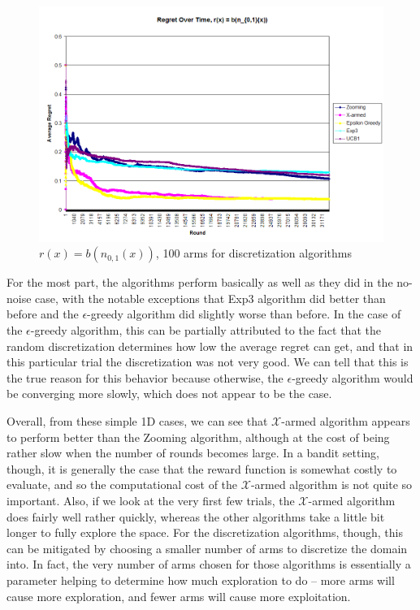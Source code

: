 \begin{figure}[!ht]
  \begin{center}
    \includegraphics[width=\figwidth]{figures/1dnoiseplot.png}
     \caption{$r(x) = b(n_{0,1}(x))$, 100 arms for discretization
     algorithms}
     \label{fig:1dnoise}
  \end{center}
\end{figure}

For the most part, the algorithms perform basically as well as they did
in the no-noise case, with the notable exceptions that Exp3 algorithm did
better than before and the $\epsilon$-greedy algorithm did slightly worse
than before.  In the case of the $\epsilon$-greedy algorithm, this can be
partially attributed to the fact that the random discretization determines
how low the average regret can get, and that in this particular trial
the discretization was not very good.  We can tell that this is the true
reason for this behavior because otherwise, the $\epsilon$-greedy algorithm
would be converging more slowly, which does not appear to be the case.

Overall, from these simple 1D cases, we can see that
$\mathcal{X}$-armed algorithm appears to perform better than the Zooming
algorithm, although at the cost of being rather slow when the number of
rounds becomes large.  In a bandit setting, though, it is generally the
case that the reward function is somewhat costly to evaluate, and so the
computational cost of the $\mathcal{X}$-armed algorithm is not quite so
important.  Also, if we look at the very first few trials, the
$\mathcal{X}$-armed algorithm does fairly well rather quickly, whereas
the other algorithms take a little bit longer to fully explore the space.
For the discretization algorithms, though, this can be mitigated by
choosing a smaller number of arms to discretize the domain into.  In fact,
the very number of arms chosen for those algorithms is essentially a 
parameter helping to determine how much exploration to do -- more arms
will cause more exploration, and fewer arms will cause more exploitation.